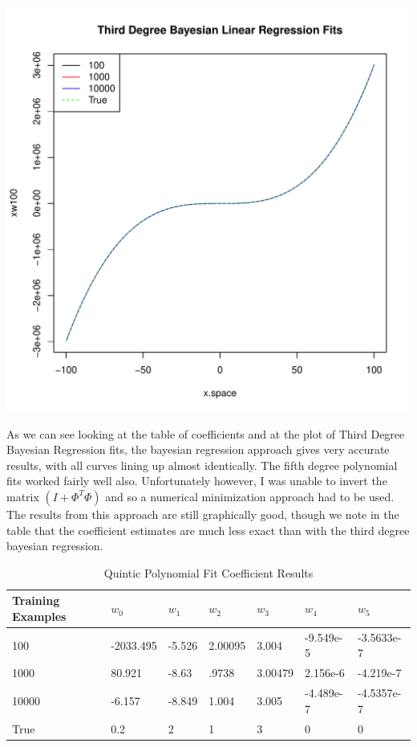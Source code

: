 \documentclass[12pt]{article}
\begin{document}
\begin{enumerate}
\begin{enumerate}[(a)]
		\includegraphics[scale=.5]{third_degree_bayesian_fits.pdf}
	
		As we can see looking at the table of coefficients and at the plot of Third Degree Bayesian Regression fits, the bayesian regression approach gives very accurate results, with all curves lining up almost identically. The fifth degree polynomial fits worked fairly well also. Unfortunately however, I was unable to invert the matrix $(I + \Phi^T\Phi)$ and so a numerical minimization approach had to be used. The results from this approach are still graphically good, though we note in the table that the coefficient estimates are much less exact than with the third degree bayesian regression. 
		
		
		\begin{table}[htb]
			\centering
			\begin{tabular}{|l|l|l|l|l|l|l|}
				\hline
				Training Examples & $w_0$     & $w_1$  & $w_2$   & $w_3$   & $w_4$     & $w_5$      \\ \hline
				100               & -2033.495 & -5.526 & 2.00095 & 3.004   & -9.549e-5 & -3.5633e-7 \\ \hline
				1000              & 80.921    & -8.63  & .9738   & 3.00479 & 2.156e-6  & -4.219e-7  \\ \hline
				10000             & -6.157    & -8.849 & 1.004   & 3.005   & -4.489e-7 & -4.5357e-7 \\ \hline
				True             & 0.2    & 2 & 1    & 3   & 0 & 0 \\ \hline
			\end{tabular}
			\caption{Quintic Polynomial Fit Coefficient Results} \label{tab:sometab}
		\end{table}
		

\end{enumerate}
\end{enumerate}
\end{document}
